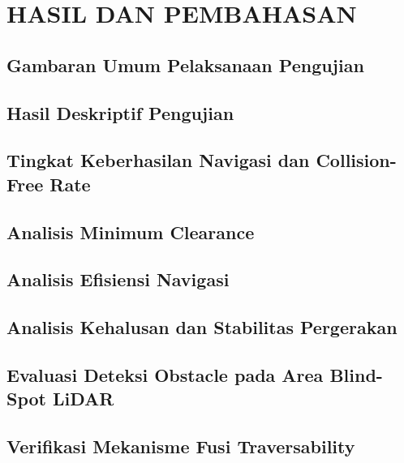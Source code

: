 \chapter{HASIL DAN PEMBAHASAN}
\label{chap:hasil_dan_pembahasan}

\section{Gambaran Umum Pelaksanaan Pengujian}
\label{sec:gambaran_pengujian}


\section{Hasil Deskriptif Pengujian}
\label{sec:hasil_deskriptif}


\section{Tingkat Keberhasilan Navigasi dan Collision-Free Rate}
\label{sec:success_rate}


\section{Analisis Minimum Clearance}
\label{sec:minimum_clearance}


\section{Analisis Efisiensi Navigasi}
\label{sec:efisiensi_navigasi}


\section{Analisis Kehalusan dan Stabilitas Pergerakan}
\label{sec:smoothness}


\section{Evaluasi Deteksi Obstacle pada Area Blind-Spot LiDAR}
\label{sec:blindspot}


\section{Verifikasi Mekanisme Fusi Traversability}
\label{sec:verif_fusi_traversability}
